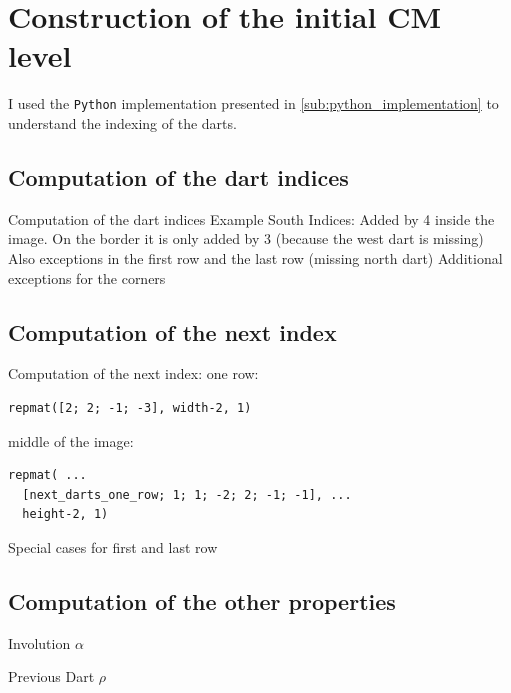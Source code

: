\documentclass[12pt]{article}
\begin{document}

\section{Construction of the initial CM level} %
\label{sec:construction_of_the_initial_cm_level}

I used the \texttt{Python} implementation presented in \cref{sub:python_implementation} to understand the indexing of the darts.

\subsection{Computation of the dart indices} %
\label{sub:computation_of_the_dart_indices}

Computation of the dart indices
Example South Indices:
Added by 4 inside the image. On the border it
is only added by 3 (because the west dart is
missing)
Also exceptions in the first row and the last
row (missing north dart)
Additional exceptions for the corners


\subsection{Computation of the next index} %
\label{sub:computation_of_the_next_index}

Computation of the next index:
one row:
\begin{lstlisting}
repmat([2; 2; -1; -3], width-2, 1)
\end{lstlisting}
middle of the image:

\begin{lstlisting}
repmat( ...
  [next_darts_one_row; 1; 1; -2; 2; -1; -1], ...
  height-2, 1)
\end{lstlisting}

Special cases for first and last row


\subsection{Computation of the other properties} %
\label{sub:computation_of_the_other_properties}

Involution \( \alpha \)

Previous Dart \( \rho \)
\end{document}
